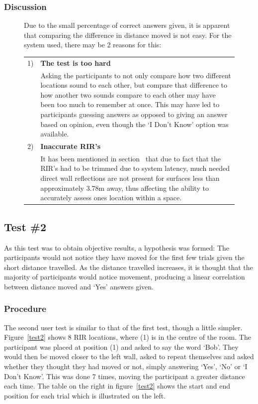 \documentclass[../../main.tex]{subfiles}
\begin{document}
		\subsubsection{Discussion}


			\begin{figure}[H]
			Due to the small percentage of correct answers given, it is apparent that comparing the difference in distance moved is not easy. For the system used, there may be 2 reasons for this:

			\begin{tabular}{l p{} }
			1) & \textbf{The test is too hard} \\
			& Asking the participants to not only compare how two different locations sound to each other, but compare that difference to how another two sounds compare to each other may have been too much to remember at once. This may have led to participants guessing answers as opposed to giving an answer based on opinion, even though the `I Don't Know' option was available. \\
			2) & \textbf{Inaccurate \ac{RIR}'s} \\
			& It has been mentioned in section~\nameref{RIRtrimming} that due to fact that the \ac{RIR}'s had to be trimmed due to system latency, much needed direct wall reflections are not present for surfaces less than approximately 3.78m away, thus affecting the ability to accurately assess ones location within a space.
			\end{tabular}
			\end{figure}

		\subsection{Test \#2}
			As this test was to obtain objective results, a hypothesis was formed: The participants would not notice they have moved for the first few trials given the short distance travelled. As the distance travelled increases, it is thought that the majority of participants would notice movement, producing a linear correlation between distance moved and `Yes' answers given.

			\subsubsection{Procedure}
				The second user test is similar to that of the first test, though a little simpler. Figure~\ref{test2} shows 8 \ac{RIR} locations, where (1) is in the centre of the room. The participant was placed at position (1) and asked to say the word `Bob'. They would then be moved closer to the left wall, asked to repeat themselves and asked whether they thought they had moved or not, simply answering `Yes', `No' or `I Don't Know'. This was done 7 times, moving the participant a greater distance each time. The table on the right in figure~\ref{test2} shows the start and end position for each trial which is illustrated on the left.
\end{document}
